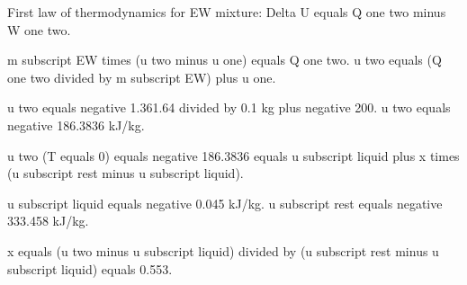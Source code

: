First law of thermodynamics for EW mixture:  
Delta U equals Q one two minus W one two.  

m subscript EW times (u two minus u one) equals Q one two.  
u two equals (Q one two divided by m subscript EW) plus u one.  

u two equals negative 1.361.64 divided by 0.1 kg plus negative 200.  
u two equals negative 186.3836 kJ/kg.  

u two (T equals 0) equals negative 186.3836 equals u subscript liquid plus x times (u subscript rest minus u subscript liquid).  

u subscript liquid equals negative 0.045 kJ/kg.  
u subscript rest equals negative 333.458 kJ/kg.  

x equals (u two minus u subscript liquid) divided by (u subscript rest minus u subscript liquid) equals 0.553.